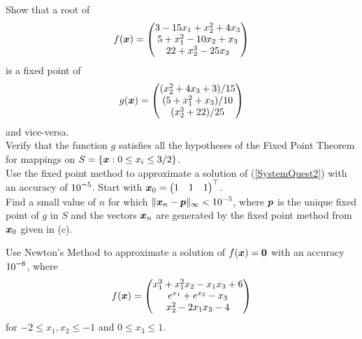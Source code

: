 \begin{question}
 Show that a root of
\begin{equation} \label{SystemQuest2}
f(\bm{x}) = \begin{pmatrix}
3 -15 x_1 + x_2^2 + 4 x_3 \\
5 + x_1^2 -10 x_2 + x_3 \\
22 +x_2^3 - 25 x_3
\end{pmatrix}
\end{equation}
is a fixed point of
\[
g(\bm{x}) =
\begin{pmatrix}
(x_2^2 + 4 x_3 + 3)/15 \\
(5 +x_1^2 +x_3)/10 \\
(x_2^3 +22)/25
\end{pmatrix}
\]
and vice-versa.\\
 Verify that the function $g$ satisfies all the hypotheses
of the Fixed Point Theorem for mappings on
$S =\left\{ \bm{x} : 0 \leq x_i \leq 3/2 \right\}$.\\
 Use the fixed point method to approximate a
solution of (\ref{SystemQuest2}) with an accuracy of
$\displaystyle 10^{-5}$.  Start with
$\displaystyle \bm{x}_0 = \begin{pmatrix} 1 & 1 & 1 \end{pmatrix}^\top$.\\
 Find a small value of $n$ for which 
$\displaystyle \| \bm{x}_n - \bm{p}\|_\infty < 10^{-5}$, where $\bm{p}$ is the
unique fixed point of $g$ in $S$ and the vectors $\bm{x}_n$
are generated by the fixed point method from $\bm{x}_0$ given in (c).
\end{question}

\begin{question}
Use Newton's Method to approximate a solution of $f(\bm{x}) = \bm{0}$
with an accuracy $\displaystyle 10^{-6}$, where
\[
f(\bm{x}) = \begin{pmatrix}
x_1^3 + x_1^2 x_2 - x_1 x_3 + 6 \\
e^{x_1} + e^{x_2} - x_3 \\
x_2^2 - 2 x_1 x_3 -4
\end{pmatrix}
\]
for $-2 \leq x_1 , x_2 \leq -1$ and $0 \leq x_3 \leq 1$.
\end{question}

